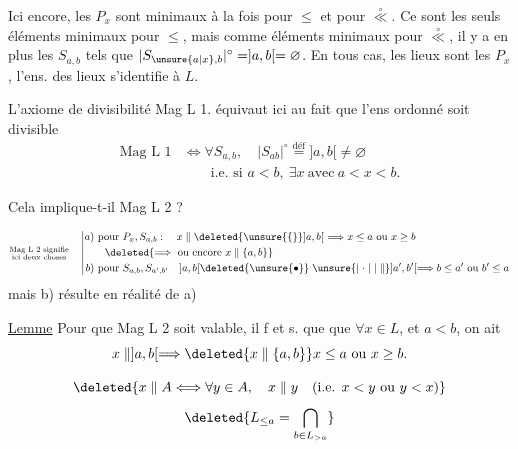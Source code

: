 Ici encore, les $P_x$ sont  minimaux à la fois pour $\leq$ et pour $\overset{\circ}{\ll}$. Ce sont les seuls éléments minimaux pour $\leq$,  mais comme éléments minimaux pour $\overset{\circ}{\ll}$, il y a en plus les $S_{a,b}$ tels que $|S_{\unsure{a|x},b}|^\circ=]a,b[=\varnothing$. En tous cas, les lieux sont les $P_x$, l'ens. des lieux s'identifie à $L$.

L'axiome de divisibilité  Mag L 1. équivaut ici au fait que  l'ens ordonné soit divisible
\[
\begin{aligned}
 \text{Mag L }1&\Longleftrightarrow \forall S_{a,b},\quad |S_{ab}|^\circ\overset{\text{déf}}{=} ]a,b[\ne\varnothing\\
 &\qquad\text{i.e. si }a<b,\ \exists x\ \text{avec}\ a<x<b.
\end{aligned}
\]

Cela implique-t-il Mag L 2 ? 

\[
\begin{aligned}
 \substack{\text{Mag L 2 signifie}\\\text{ici deux choses}}\quad
 \left|\begin{aligned}
 a)&\ \text{pour }P_x,S_{a,b}:\quad
     x\parallel\deleted{\unsure{\{} }]a,b[\ \Longrightarrow x\leq a\ \text{ou}\ x\geq b\\
 &\quad\deleted{\Longrightarrow\text{ ou encore }x\parallel\{a,b\}}\\
 b)&\ \text{pour }S_{a,b},S_{a',b'}\quad
      ]a,b[\deleted{\unsure{\bullet}}\mathrel{\unsure{\mid\cdot\mid|\parallel}}]a',b'[
         \Longrightarrow b\leq a'\ \text{ou}\ b'\leq a
 \end{aligned}\right.
\end{aligned}
\]
mais b) résulte en réalité de a)  \deleted{$\Rightarrow\ \unsure{\{a,b\}}\parallel ]a',b'[$, et \unsure{on applique} a)}


\uline{Lemme} Pour que Mag L 2 soit valable, il f et s. que   que  $\forall x\in L$, et $a<b$, on ait
\[
 x\parallel ]a,b[ \Longrightarrow \deleted{x\parallel\{a,b\}} x\leq a\ \text{ou}\ x\geq b.
\]

\[
 \deleted{x\parallel A\Longleftrightarrow\forall y\in A,\quad x\parallel y\quad
         (\text{i.e. } x<y\ \text{ou}\ y<x)}
\]
\[
 \deleted{L_{\leq a}=\bigcap_{b\in L_{>a}}}
\]

